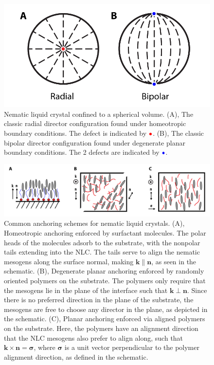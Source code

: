 \begin{figure}[h]
  \centering
  \includegraphics{figures/C2/Ch2-Figs_DropSchem.png}
  \caption{Nematic liquid crystal confined to a spherical volume.
  (A), The classic radial director configuration found under homeotropic boundary conditions.
  The defect is indicated by ${\color{red} \bullet}$.
  (B), The classic bipolar director configuration found under degenerate planar boundary conditions.
  The 2 defects are indicated by ${\color{blue} \bullet}$.}\label{f:2-DropSchem}
\end{figure}

\begin{figure}[h]
  \centering
  \includegraphics{figures/C2/Ch2-Figs_Anchor.png}
  \caption{Common anchoring schemes for nematic liquid crystals. (A), Homeotropic anchoring enforced by surfactant molecules.
  The polar heads of the molecules adsorb to the substrate, with the nonpolar tails extending into the NLC.
  The tails serve to align the nematic mesogens along the surface normal, making $\mathbf{k} \parallel \mathbf{n}$, as seen in the schematic.
  (B), Degenerate planar anchoring enforced by randomly oriented polymers on the substrate. The polymers only require that the mesogens lie in the plane of the interface such that $\mathbf{k} \perp \mathbf{n}$. Since there is no preferred direction in the plane of the substrate, the mesogens are free to choose any director in the plane, as depicted in the schematic.
  (C), Planar anchoring enforced via aligned polymers on the substrate. Here, the polymers have an alignment direction that the NLC mesogens also prefer to align along, such that $\mathbf{k} \times \mathbf{n} = \bm{\sigma}$, where $\bm{\sigma}$ is a unit vector perpendicular to the polymer alignment direction, as defined in the schematic.}\label{f:2-Anchor}
\end{figure}

